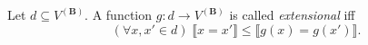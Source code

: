 Let $d \subseteq V^{(\mathbf{B})}$. A function $g: d \to V^{(\mathbf{B})}$ is called \emph{extensional} iff
$$(\forall x, x' \in d)\; \llbracket x = x' \rrbracket \leq \llbracket g(x) = g(x') \rrbracket.$$
